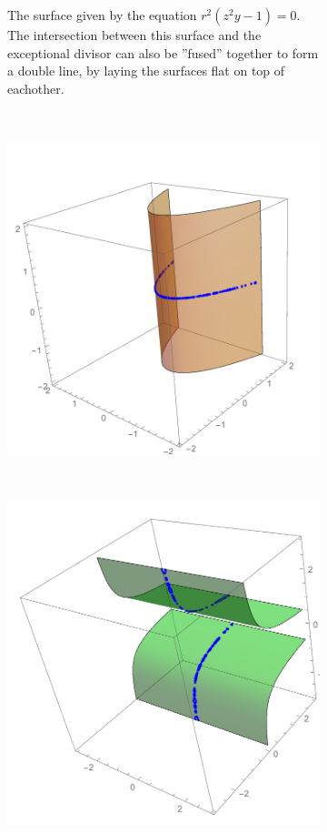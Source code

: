 \documentclass{article}
\begin{document}
\begin{example}
\begin{figure}[h!]
\begin{subfigure}[t]{0.3\textwidth}
            \caption{The surface given by the equation $r^2(z^2y - 1) = 0$. The
            intersection between this surface and the exceptional divisor can
        also be ''fused'' together to form a double line, by laying the
    surfaces flat on top of eachother.}
        \end{subfigure}
        \\
        \begin{subfigure}[t]{0.3\textwidth}
            \includegraphics[width=\textwidth]{../pictures/affine_1_exceptional.pdf} 
        \end{subfigure}
        ~
        \begin{subfigure}[t]{0.3\textwidth}
            \includegraphics[width=\textwidth]{../pictures/affine_2_exceptional.pdf} 

\end{subfigure}
\end{figure}
\end{example}
\end{document}
